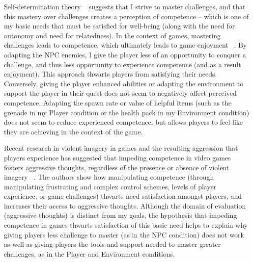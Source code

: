 Self-determination theory ~\cite{ryan2000self} suggests that I strive to master challenges, and that this mastery over challenges creates a perception of competence – which is one of my basic needs that must be satisfied for well-being (along with the need for autonomy and need for relatedness). In the context of games, mastering challenges leads to competence, which ultimately leads to game enjoyment ~\cite{ryan2006motivational}. By adapting the NPC enemies, I give the player less of an opportunity to conquer a challenge, and thus less opportunity to experience competence (and as a result enjoyment). This approach thwarts players from satisfying their needs. Conversely, giving the player enhanced abilities or adapting the environment to support the player in their quest does not seem to negatively affect perceived competence. Adapting the spawn rate or value of helpful items (such as the grenade in my Player condition or the health pack in my Environment condition) does not seem to reduce experienced competence, but allows players to feel like they are achieving in the context of the game.

Recent research in violent imagery in games and the resulting aggression that players experience has suggested that impeding competence in video games fosters aggressive thoughts, regardless of the presence or absence of violent imagery ~\cite{przybylski2013competence}. The authors show how manipulating competence (through manipulating frustrating and complex control schemes, levels of player experience, or game challenges) thwarts need satisfaction amongst players, and increases their access to aggressive thoughts. Although the domain of evaluation (aggressive thoughts) is distinct from my goals, the hypothesis that impeding competence in games thwarts satisfaction of this basic need helps to explain why giving players less challenge to master (as in the NPC condition) does not work as well as giving players the tools and support needed to master greater challenges, as in the Player and Environment conditions.

